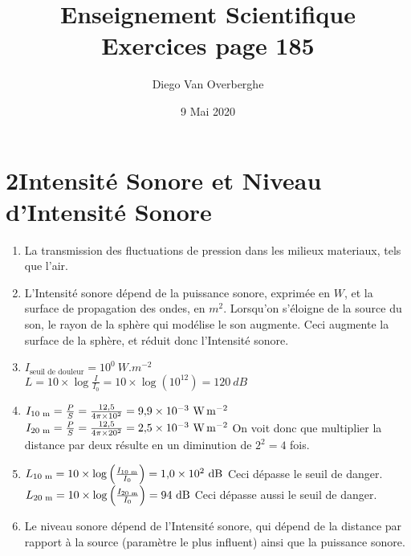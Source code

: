 \documentclass[12pt, a4paper]{article}
\newcommand{\logb}[1]{
    \log\left(#1\right)
}
\begin{document}
    \title{Enseignement Scientifique \\ Exercices page 185}
    \author{Diego Van Overberghe}
    \date{9 Mai 2020}
    \maketitle
    
    \section*{2\quad Intensité Sonore et Niveau d'Intensité Sonore}
    \begin{enumerate}[1.]
        \item   La transmission des fluctuations de pression dans les milieux materiaux, tels que l'air.
        \item   L'Intensité sonore dépend de la puissance sonore, exprimée en $\si{W}$, et la surface de propagation des ondes, en $\si{m^2}$. Lorsqu'on s'éloigne de la source du son, le rayon de la sphère qui modélise le son augmente. Ceci augmente la surface de la sphère, et réduit donc l'Intensité sonore.
        \item   $I_\text{seuil de douleur}=10^0\ \si{W.m^{-2}}$ \\ $L=10\times\log{\frac{I}{I_0}}=10\times\logb{10^{12}}=120\ \si{dB}$
        \item   $I_\text{10\ \si{m}}=\frac{P}{S}=\frac{12{,}5}{4\pi\times 10^2}=9{,}9\times 10^{-3}\ \si{W.m^{-2}}$ \smallbreak $I_\text{20\ \si{m}}=\frac{P}{S}=\frac{12{,}5}{4\pi\times 20^2}=2{,}5\times 10^{-3}\ \si{W.m^{-2}}$ \smallbreak On voit donc que multiplier la distance par deux résulte en un diminution de $2^2=4$ fois.
        \item $L_\text{10\ \si{m}}=10\times\logb{\frac{I_\text{10\ \si{m}}}{I_0}}=1{,}0\times 10^2\ \si{dB}$ \quad Ceci dépasse le seuil de danger. \smallbreak $L_\text{20\ \si{m}}=10\times\logb{\frac{I_\text{20\ \si{m}}}{I_0}}=94\ \si{dB}$ \quad Ceci dépasse aussi le seuil de danger.
        \item Le niveau sonore dépend de l'Intensité sonore, qui dépend de la distance par rapport à la source (paramètre le plus influent) ainsi que la puissance sonore.
    \end{enumerate}
\end{document}
